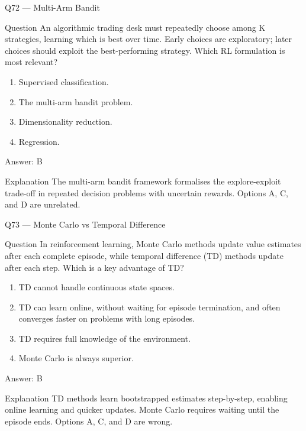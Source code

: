 \documentclass[aspectratio=169,8pt]{beamer}
\begin{document}
	\begin{frame}{Q72 --- Multi-Arm Bandit}
		\begin{block}{Question}
			An algorithmic trading desk must repeatedly choose among K strategies, learning which is best over time. Early choices are exploratory; later choices should exploit the best-performing strategy. Which RL formulation is most relevant?
		\end{block}
		\begin{enumerate}
			\item Supervised classification.
			\item The multi-arm bandit problem.
			\item Dimensionality reduction.
			\item Regression.
		\end{enumerate}
		\begin{exampleblock}{Answer: B}\end{exampleblock}
		\begin{block}{Explanation}
			The multi-arm bandit framework formalises the explore-exploit trade-off in repeated decision problems with uncertain rewards. Options A, C, and D are unrelated.
		\end{block}
	\end{frame}
	
	\begin{frame}{Q73 --- Monte Carlo vs Temporal Difference}
		\begin{block}{Question}
			In reinforcement learning, Monte Carlo methods update value estimates after each complete episode, while temporal difference (TD) methods update after each step. Which is a key advantage of TD?
		\end{block}
		\begin{enumerate}
			\item TD cannot handle continuous state spaces.
			\item TD can learn online, without waiting for episode termination, and often converges faster on problems with long episodes.
			\item TD requires full knowledge of the environment.
			\item Monte Carlo is always superior.
		\end{enumerate}
		\begin{exampleblock}{Answer: B}\end{exampleblock}
		\begin{block}{Explanation}
			TD methods learn bootstrapped estimates step-by-step, enabling online learning and quicker updates. Monte Carlo requires waiting until the episode ends. Options A, C, and D are wrong.
		\end{block}
	\end{frame}
	
\end{document}
